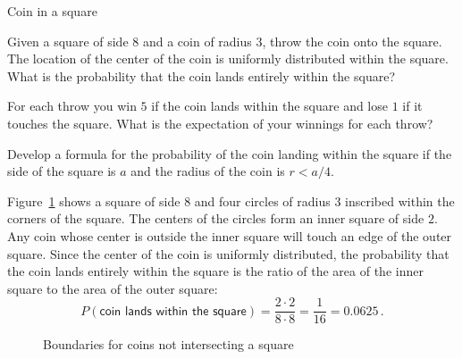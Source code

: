 

\begin{prob}{Coin in a square}

 Given a square of side $8$ and a coin of radius $3$, throw the coin onto the square. The location of the center of the coin is uniformly distributed within the square. What is the probability that the coin lands entirely within the square?

 For each throw you win $5$ if the coin lands within the square and lose $1$ if it touches the square. What is the expectation of your winnings for each throw?

 Develop a formula for the probability of the coin landing within the square if the side of the square is $a$ and the radius of the coin is $r<a/4$.
\end{prob}

\solution{}

 Figure~\ref{f.coins1} shows a square of side $8$ and four circles of radius $3$ inscribed within the corners of the square. The centers of the circles form an inner square of side $2$. Any coin whose center is outside the inner square will touch an edge of the outer square. Since the center of the coin is uniformly distributed, the probability that the coin lands entirely within the square is the ratio of the area of the inner square to the area of the outer square:
\[
P(\textsf{coin lands within the square})=\frac{2\cdot 2}{8\cdot 8} =\frac{1}{16}=0.0625\,.
\]
\begin{figure}[tb]
\begin{center}
\end{center}
\caption{Boundaries for coins not intersecting a square}\label{f.coins1}
\end{figure}

